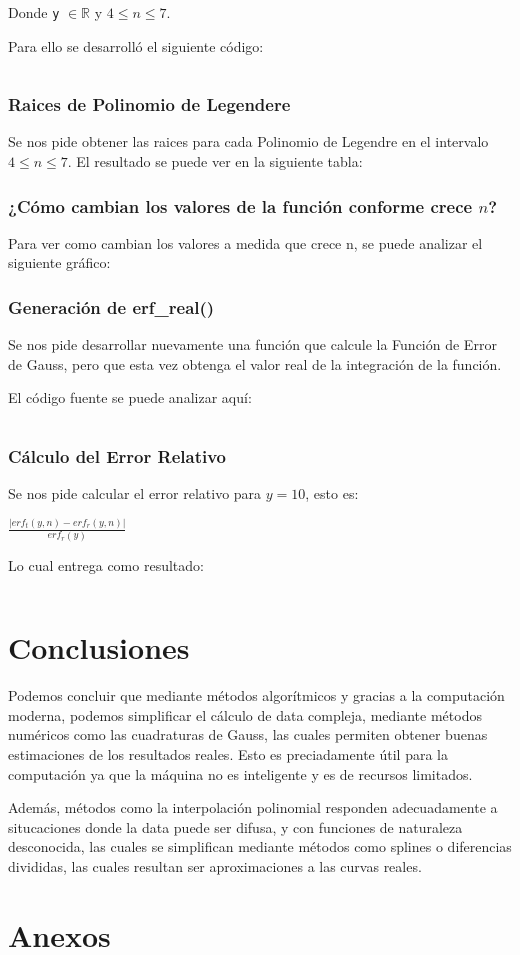\documentclass[12pt,letterpaper]{article}
\begin{document}
Donde \verb+y+ $\in \mathbb{R}$ y $4 \leq n \leq 7$.

Para ello se desarrolló el siguiente código:
\begin{verbatim}
\end{verbatim}
\subsubsection{Raices de Polinomio de Legendere}
Se nos pide obtener las raices para cada Polinomio de Legendre en el intervalo $4 \leq n \leq 7$. El resultado se puede ver en la siguiente tabla:

\subsubsection{¿Cómo cambian los valores de la función conforme crece $n$?}
Para ver como cambian los valores a medida que crece n, se puede analizar el siguiente gráfico:

\subsubsection{Generación de erf\_real()}
Se nos pide desarrollar nuevamente una función que calcule la Función de Error de Gauss, pero que esta vez obtenga el valor real de la integración de la función.

El código fuente se puede analizar aquí:
\begin{verbatim}
\end{verbatim}

\subsubsection{Cálculo del Error Relativo}
Se nos pide calcular el error relativo para $y=10$, esto es:
\begin{center}
$\frac{|erf_t(y,n) - erf_r(y,n)|}{erf_r(y)}$
\end{center}

Lo cual entrega como resultado:
\begin{verbatim}
\end{verbatim}

\section{Conclusiones}
Podemos concluir que mediante métodos algorítmicos y gracias a la computación moderna, podemos simplificar el cálculo de data compleja, mediante métodos numéricos como las cuadraturas de Gauss, las cuales permiten obtener buenas estimaciones de los resultados reales. Esto es preciadamente útil para la computación ya que la máquina no es inteligente y es de recursos limitados.

Además, métodos como la interpolación polinomial responden adecuadamente a situcaciones donde la data puede ser difusa, y con funciones de naturaleza desconocida, las cuales se simplifican mediante métodos como splines o diferencias divididas, las cuales resultan ser aproximaciones a las curvas reales.
\section{Anexos}
\end{document}
